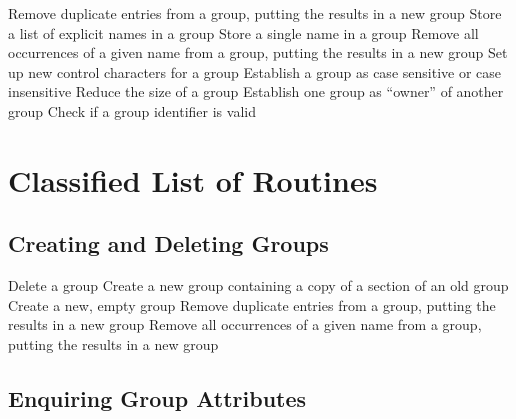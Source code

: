             {Remove duplicate entries from a group, putting the results in a new
group}
            {Store a list of explicit names in a group}
            {Store a single name in a group}
            {Remove all occurrences of a given name from a group, putting the results in a new group}
            {Set up new control characters for a group}
            {Establish a group as case sensitive or case insensitive}
            {Reduce the size of a group}
            {Establish one group as ``owner'' of another group}
            {Check if a group identifier is valid}

\section{Classified List of Routines}

\subsection{Creating and Deleting Groups}

            {Delete a group}
            {Create a new group containing a copy of a section of an old group}
            {Create a new, empty group}
            {Remove duplicate entries from a group, putting the results in a new
group}
            {Remove all occurrences of a given name from a group, putting the results in a new group}

\subsection{Enquiring Group Attributes}

